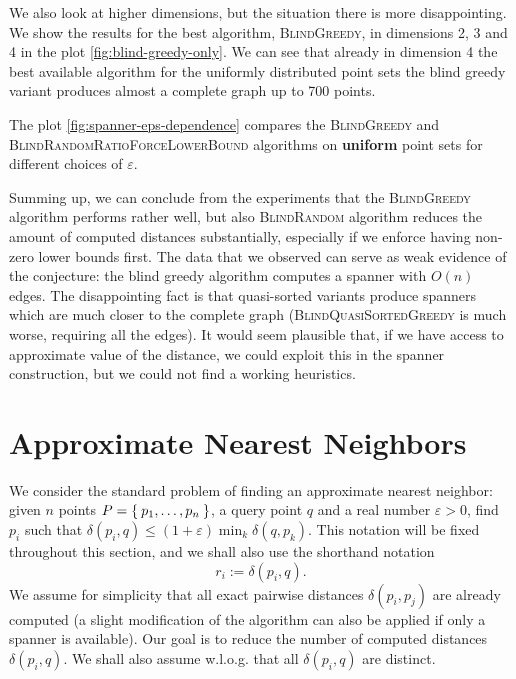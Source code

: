 \documentclass[a4paper,USenglish]{socg-lipics-v2018}
\newcommand{\eps}{\varepsilon}
\newcommand{\dist}{\delta}
\begin{document}
We also look at higher dimensions, but the situation there is more
disappointing. We show the results for the best algorithm, \textsc{BlindGreedy},
in dimensions 2, 3 and 4 in the plot \ref{fig:blind-greedy-only}.
We can see that already in dimension 4 the best available algorithm
for the uniformly distributed point sets the blind greedy variant
produces almost a complete graph up to 700 points.  


The plot \ref{fig:spanner-eps-dependence}
compares the \textsc{BlindGreedy} and \textsc{BlindRandomRatioForceLowerBound} algorithms
on \textbf{uniform} point sets for different choices of $\eps$.

Summing up, we can conclude from the experiments that 
 the \textsc{BlindGreedy} algorithm performs rather well, but also \textsc{BlindRandom}
algorithm reduces the amount of computed distances substantially, especially if we enforce having non-zero lower bounds
first. The data that we observed can serve as weak evidence
of the conjecture: the blind greedy algorithm computes
a spanner with $O(n)$ edges. The disappointing fact is that quasi-sorted variants produce spanners which are much closer to the complete graph
(\textsc{BlindQuasiSortedGreedy} is much worse, requiring all the edges). It would seem plausible that, if we have
access to approximate value of the distance, we could exploit this in the spanner construction, but we could not
find a working heuristics.

\section{Approximate Nearest Neighbors}
\label{sec:ann}
We consider the standard problem of finding an approximate nearest neighbor: given
$n$ points $P = \Set{p_1, \dots, p_n}$, a query point $q$ and a real number $\eps > 0$,
find $p_i$ such that $\dist(p_i, q) \leq (1 + \eps) \min_{k} \dist(q, p_k)$. This notation will be fixed throughout this 
section, and we shall also use the shorthand notation
\[
    r_i := \dist(p_i, q).
\]
We assume for simplicity
that all exact pairwise distances $\dist(p_i, p_j)$ are already computed
(a slight modification of the algorithm can also be applied if only a spanner is available).
Our goal is to reduce the number of computed distances $\dist(p_i, q)$. We shall also assume w.l.o.g.
that all $\dist(p_i, q)$ are distinct.
\end{document}
